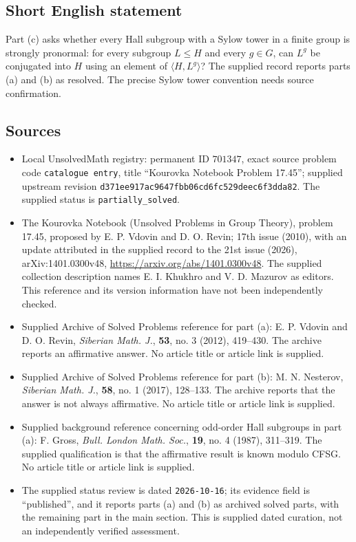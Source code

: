 \documentclass[11pt]{article}
\begin{document}
\subsection{Short English statement}
Part (c) asks whether every Hall subgroup with a Sylow tower in a finite group is strongly pronormal: for every subgroup \(L\leq H\) and every \(g\in G\), can \(L^g\) be conjugated into \(H\) using an element of \(\langle H,L^g\rangle\)? The supplied record reports parts (a) and (b) as resolved. The precise Sylow tower convention needs source confirmation.
\subsection{Sources}
\begin{itemize}
\item Local UnsolvedMath registry: permanent ID \(701347\), exact source problem code \texttt{catalogue entry}, title ``Kourovka Notebook Problem 17.45''; supplied upstream revision \texttt{d371ee917ac9647fbb06cd6fc529deec6f3dda82}. The supplied status is \texttt{partially\_solved}.
\item The Kourovka Notebook (Unsolved Problems in Group Theory), problem 17.45, proposed by E. P. Vdovin and D. O. Revin; 17th issue (2010), with an update attributed in the supplied record to the 21st issue (2026), arXiv:1401.0300v48, \url{https://arxiv.org/abs/1401.0300v48}. The supplied collection description names E. I. Khukhro and V. D. Mazurov as editors. This reference and its version information have not been independently checked.
\item Supplied Archive of Solved Problems reference for part (a): E. P. Vdovin and D. O. Revin, \emph{Siberian Math. J.}, \textbf{53}, no. 3 (2012), 419--430. The archive reports an affirmative answer. No article title or article link is supplied.
\item Supplied Archive of Solved Problems reference for part (b): M. N. Nesterov, \emph{Siberian Math. J.}, \textbf{58}, no. 1 (2017), 128--133. The archive reports that the answer is not always affirmative. No article title or article link is supplied.
\item Supplied background reference concerning odd-order Hall subgroups in part (a): F. Gross, \emph{Bull. London Math. Soc.}, \textbf{19}, no. 4 (1987), 311--319. The supplied qualification is that the affirmative result is known modulo CFSG. No article title or article link is supplied.
\item The supplied status review is dated \texttt{2026-10-16}; its evidence field is ``published'', and it reports parts (a) and (b) as archived solved parts, with the remaining part in the main section. This is supplied dated curation, not an independently verified assessment.
\end{itemize}
\end{document}
